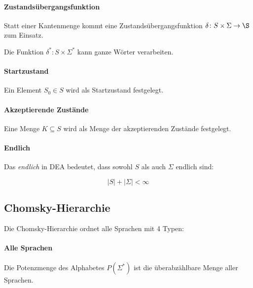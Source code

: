 \documentclass[../main.tex]{subfiles}
\begin{document}
                \paragraph{Zustandsübergangsfunktion}
                    Statt einer Kantenmenge kommt eine Zustandsübergangsfunktion $\delta\colon S \times \Sigma \rightarrow \S$ zum Einsatz.
                    
                    Die Funktion $\delta^*\colon S \times \Sigma^*$ kann ganze Wörter verarbeiten.
                    
                
                    
                \paragraph{Startzustand}
                    Ein Element $S_0 \in S$ wird als Startzustand festgelegt.
                
                \paragraph{Akzeptierende Zustände}
                    Eine Menge $K \subseteq S$ wird als Menge der akzeptierenden Zustände festgelegt.
                    
                \paragraph{Endlich}
                    Das \emph{endlich} in DEA bedeutet, dass sowohl $S$ als auch $\Sigma$ endlich sind:
                    
                    \begin{equation}
                        |S| + |\Sigma| < \infty
                    \end{equation}
                    
        \subsection{Chomsky-Hierarchie}
            Die Chomsky-Hierarchie ordnet alle Sprachen mit 4 Typen:
            
            \paragraph{Alle Sprachen}
                Die Potenzmenge des Alphabetes $P(\Sigma^*)$ ist die überabzählbare Menge aller Sprachen.
            
\end{document}
